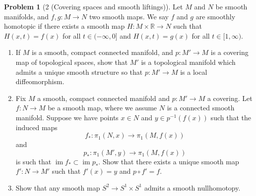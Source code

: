 \documentclass[reqno]{amsart}
\theoremstyle{definition}
\newtheorem{problem}[theorem]{Problem}
\theoremstyle{remark}
\DeclareMathOperator{\im}{im}
\begin{document}
    \begin{problem}[2 (Covering spaces and smooth liftings)]
        Let $M$ and $N$ be smooth manifolds, and
        $f, g \colon M \to N$ two smooth maps.
        We say $f$ and $g$ are smoothly homotopic if there exists
        a smooth map
        $H \colon M \times \mathbb{R} \to N$ such that
        $H(x,t) = f(x)$ for all
        $t \in (-\infty, 0]$ and
        $H (x,t) = g(x)$ for all
        $t \in [1, \infty)$.
        \begin{enumerate}
            \item If $M$ is a smooth, compact connected
                manifold, and $p \colon
                M' \to M$ is a covering map of
                topological spaces, show that
                $M'$ is a topological manifold which
                admits a unique smooth structure so that
                $p \colon M' \to M$ is a local
                diffeomorphism.
            \item Fix $M$ a smooth, compact connected
                manifold and $p \colon M' \to M$ a
                covering. Let $f \colon N \to M$ be
                a smooth map, where we assume
                $N$ is a connected smooth manifold. 
                Suppose we have points
                $x \in N$ and
                $y \in p^{-1}\left( f(x) \right) $ such that
                the induced maps
                \[
                f_* \colon \pi_1(N,x) \to \pi_1(M,f(x))
                \] 
                and
                \[
                p_* \colon \pi_1 (M',y)
                \to \pi_1(M, f(x))
                \] 
                is such that
                $\im f_* \subset \im p_*$. Show that there
                exists a unique smooth map
                $f' \colon N \to M'$ such that
                $f'(x) = y$ and
                $p \circ f' = f$.
            \item Show that any smooth map
                $S^{2} \to S^{1} \times S^{1}$ admits
                a smooth nullhomotopy.
        \end{enumerate}
    \end{problem}
\end{document}
